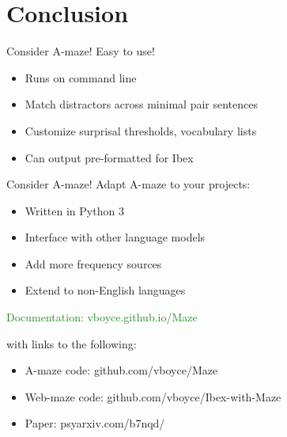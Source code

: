 \documentclass[12pt, xcolor=beamer,table,usenames,dvipsnames, ignorenonframetext, ngerman]{beamer}
\begin{document}
\section{Conclusion}

\begin{frame}{Consider A-maze!}
Easy to use! \pause
\begin{itemize}
	\item Runs on command line \pause
	\item Match distractors across minimal pair sentences \pause
	\item Customize surprisal thresholds, vocabulary lists \pause
	\item Can output pre-formatted for Ibex
\end{itemize}
\medskip
\end{frame}

\begin{frame}{Consider A-maze!} \pause
Adapt A-maze to your projects:
\begin{itemize}
	\item Written in Python 3 
	\item Interface with other language models 
	\item Add more frequency sources 
	\item Extend to non-English languages
\end{itemize}

\end{frame}

\begin{frame}{}

\textcolor{ForestGreen}{\large Documentation: vboyce.github.io/Maze}

with links to the following:
\begin{itemize}

\item A-maze code: github.com/vboyce/Maze

\item Web-maze code: github.com/vboyce/Ibex-with-Maze

\item Paper: psyarxiv.com/b7nqd/
\end{itemize}
\end{frame}


\appendix
\end{document}
